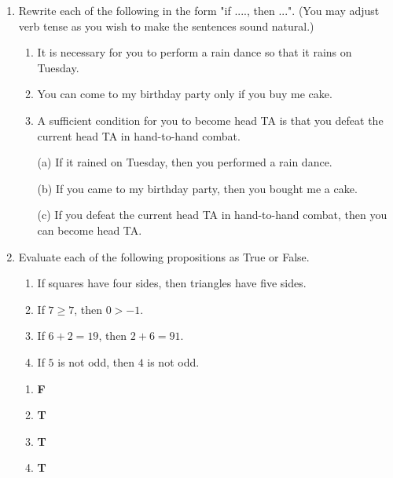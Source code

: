 \begin{enumerate}
    \item Rewrite each of the following in the form "if ...., then ...".  (You may adjust verb tense as you wish to make the sentences sound natural.) 
    \begin{enumerate}
        \item It is necessary for you to perform a rain dance so that it rains on Tuesday.
        
        \item You can come to my birthday party only if you buy me cake.
        
        \item A sufficient condition for you to become head TA is that you defeat the current head TA in hand-to-hand combat.
    \end{enumerate}
    \begin{solution}
        \begin{enumerate}
            \item[(a)] If it rained on Tuesday, then you performed a rain dance.
            \item[(b)] If you came to my birthday party, then you bought me a cake.
            \item[(c)] If you defeat the current head TA in hand-to-hand combat, then you can become head TA.
        \end{enumerate}
    \end{solution}



    \item Evaluate each of the following propositions as True or False. 
    \begin{enumerate}
        \item If squares have four sides, then triangles have five sides.
        \item If $7 \geq 7$, then $0 > -1$.
        \item If $6+2 = 19$, then $2+6=91$.
        \item If $5$ is not odd, then $4$ is not odd. 
    \end{enumerate}
    \begin{solution}
        \begin{enumerate}
            \item \textbf{F}
            \item \textbf{T}
            \item \textbf{T}
            \item \textbf{T}
        \end{enumerate}
    \end{solution}




\end{enumerate}
